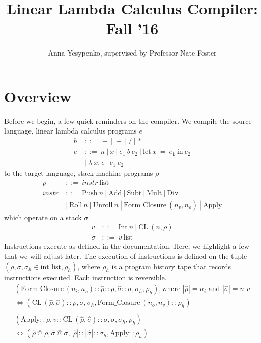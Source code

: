 \documentclass[11pt]{article}
\begin{document}
\title{Linear Lambda Calculus Compiler: Fall '16}
\author{Anna Yesypenko, supervised by Professor Nate Foster}
\maketitle

\section*{Overview}
Before we begin, a few quick reminders on the compiler. We compile the source language, linear lambda calculus programs $e$
\begin{align*}
    b\ &::=\ +\ |\ -\ |\ /\ |\ *\\
    e\ &::=\ n\ |\ x\ |\ e_1\ b\ e_2\ |\ \text{let}\ x\ =\ e_1\ \text{in}\ e_2\\
    &|\ \lambda\ x.\ e\ |\ e_1\ e_2
\end{align*}
to the target language, stack machine programs $\rho$
\begin{align*}
    \rho &::=\ instr\ \text{list}\\
    instr\ &::=\ \text {Push}\ n\ |\ \text {Add}\ |\ \text {Subt}\ |\ \text {Mult}\ |\ \text {Div}\\
    & |\ \text{Roll}\ n\ |\ \text {Unroll}\ n\ |\ \text{Form\_Closure}\ (n_v, n_{\rho})\ |\ \text{Apply}
\end{align*}
which operate on a stack $\sigma$
\begin{align*}
    v\ &::=\ \text {Int}\ n\ |\ \text {CL}\ (n, \rho) \\
    \sigma &::=\ v\ \text{list}
\end{align*}
Instructions execute as defined in the documentation. Here, we highlight a few that we will adjust later. The execution of instructions is defined on the tuple $(\rho, \sigma, \sigma_h \in \text{int list}, \rho_h)$, where $\rho_h$ is a program history tape that records instructions executed. Each instruction is reversible.
\begin{gather*}
    (\text{Form\_Closure}\ (n_i, n_v)::\hat{\rho}::\rho, \hat{\sigma}::\sigma, \sigma_h, \rho_h), \text{where $|\hat{\rho}| = n_i$ and $|\hat{\sigma}| = n\_v$}\\
    \Longleftrightarrow (\text{CL}\ (\hat{\rho}, \hat{\sigma}) :: \rho, \sigma, \sigma_h, \text{Form\_Closure}\ (n_o, n_v)::\rho_h)\\ \\
    (\text{Apply}::\rho, v::\text{CL}\ (\hat{\rho}, \hat{\sigma})::\sigma, \sigma, \sigma_h, \rho_h) \\
    \Longleftrightarrow (\hat{\rho}\ @\ \rho, \hat{\sigma}\ @\ \sigma, |\hat{\rho}|::|\hat{\sigma}|::\sigma_h, \text{Apply}::\rho_h)
\end{gather*}
\end{document}
